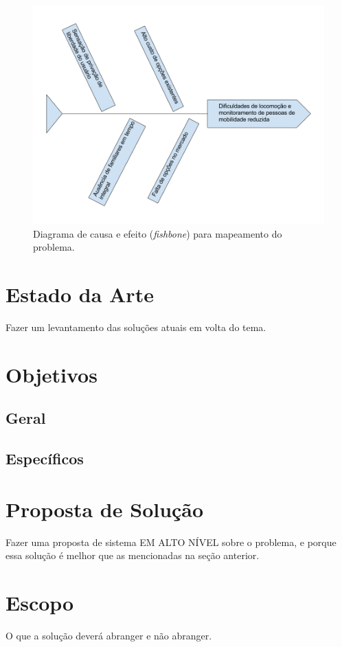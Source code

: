 	\begin{figure}[h]
	\centering
	\label{fishbone}
		\includegraphics[keepaspectratio=true,scale=0.3]{figuras/fishbone.png}
	\caption{Diagrama de causa e efeito (\textit{fishbone}) para mapeamento do problema.}
\end{figure}


\section{Estado da Arte}

Fazer um levantamento das soluções atuais em volta do tema.

\section{Objetivos}

\subsection{Geral}

\subsection{Específicos}

\section{Proposta de Solução}

Fazer uma proposta de sistema EM ALTO NÍVEL sobre o problema, e porque essa solução é melhor que as mencionadas na seção anterior.

\section{Escopo}

O que a solução deverá abranger e não abranger.
